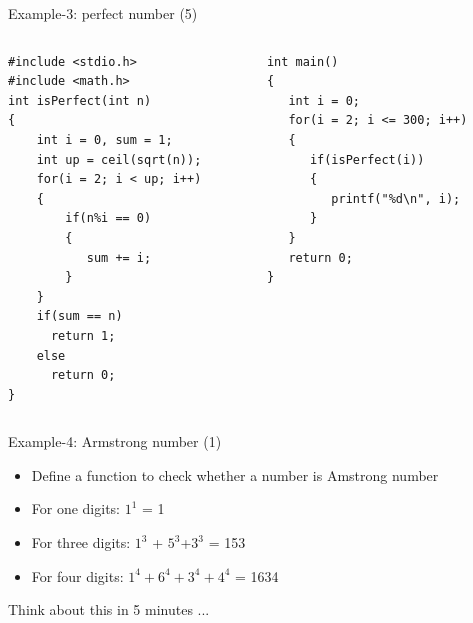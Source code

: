 \begin{frame}[fragile]{Example-3: perfect number (5)}
\vspace{-0.16in}
\begin{columns}
\begin{column}{0.48\linewidth}
\begin{lstlisting}[linewidth=0.95\linewidth]
#include <stdio.h>
#include <math.h>
int isPerfect(int n)
{
    int i = 0, sum = 1;
    int up = ceil(sqrt(n));
    for(i = 2; i < up; i++)
    {
        if(n%i == 0)
        {
           sum += i;
        }
    }
    if(sum == n)
      return 1;
    else 
      return 0;
}
\end{lstlisting}
\end{column}
\begin{column}{0.48\linewidth}
\begin{lstlisting}[firstnumber=19, linewidth=0.95\linewidth]
int main()
{
   int i = 0;
   for(i = 2; i <= 300; i++)
   {
      if(isPerfect(i))
      {
         printf("%d\n", i);
      }
   }
   return 0;
}
\end{lstlisting}
\end{column}
\end{columns}
\end{frame}



\begin{frame}[fragile]{Example-4: Armstrong number (1)}
\vspace{-0.16in}
\begin{itemize}
	\item {Define a function to check whether a number is Amstrong number}
	\item {For one digits: $1^1$ = 1}
	\item {For three digits: $1^3$ + $5^3$+$3^3$ = 153}
	\item {For four digits: $1^4 + 6^4 + 3^4 + 4^4$ = 1634}
\end{itemize}
\begin{center}
	\Large{
	   Think about this in 5 minutes ...
	}
\end{center}
\end{frame}

